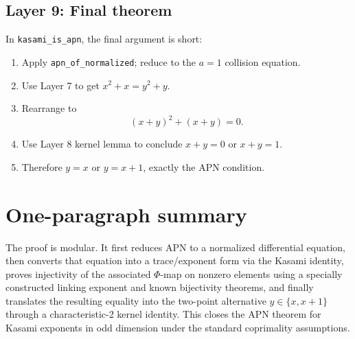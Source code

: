 \documentclass[11pt]{article}
\begin{document}
\subsection*{Layer 9: Final theorem}
In \texttt{kasami\_is\_apn}, the final argument is short:
\begin{enumerate}
  \item Apply \texttt{apn\_of\_normalized}; reduce to the $a=1$ collision equation.
  \item Use Layer 7 to get $x^2+x=y^2+y$.
  \item Rearrange to
  \[
    (x+y)^2+(x+y)=0.
  \]
  \item Use Layer 8 kernel lemma to conclude $x+y=0$ or $x+y=1$.
  \item Therefore $y=x$ or $y=x+1$, exactly the APN condition.
\end{enumerate}

\section{One-paragraph summary}
The proof is modular. It first reduces APN to a normalized differential equation, then converts that equation into a trace/exponent form via the Kasami identity, proves injectivity of the associated $\Phi$-map on nonzero elements using a specially constructed linking exponent and known bijectivity theorems, and finally translates the resulting equality into the two-point alternative $y\in\{x,x+1\}$ through a characteristic-2 kernel identity. This closes the APN theorem for Kasami exponents in odd dimension under the standard coprimality assumptions.
\end{document}
